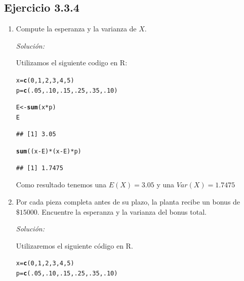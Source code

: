 \documentclass{article}\usepackage[]{graphicx}\usepackage[]{color}
\makeatletter
\newcommand{\hlnum}[1]{\textcolor[rgb]{0.686,0.059,0.569}{#1}}%
\newcommand{\hlopt}[1]{\textcolor[rgb]{0,0,0}{#1}}%
\newcommand{\hlstd}[1]{\textcolor[rgb]{0.345,0.345,0.345}{#1}}%
\newcommand{\hlkwb}[1]{\textcolor[rgb]{0.69,0.353,0.396}{#1}}%
\newcommand{\hlkwd}[1]{\textcolor[rgb]{0.737,0.353,0.396}{\textbf{#1}}}%
\newenvironment{kframe}{%
 \def\at@end@of@kframe{}%
 \ifinner\ifhmode%
  \def\at@end@of@kframe{\end{minipage}}%
  \begin{minipage}{\columnwidth}%
 \fi\fi%
 \def\FrameCommand##1{\hskip\@totalleftmargin \hskip-\fboxsep
 \colorbox{shadecolor}{##1}\hskip-\fboxsep
     \hskip-\linewidth \hskip-\@totalleftmargin \hskip\columnwidth}%
 \MakeFramed {\advance\hsize-\width
   \@totalleftmargin\z@ \linewidth\hsize
   \@setminipage}}%
 {\par\unskip\endMakeFramed%
 \at@end@of@kframe}
\newenvironment{knitrout}{}{} %
\makeatother
\begin{document}
\subsection{Ejercicio 3.3.4}
\begin{enumerate}
    \item Compute la esperanza y la varianza de $X$.
    
    \textit{Solución: }
    
Utilizamos el siguiente codigo en R:

\begin{knitrout}
\color{fgcolor}\begin{kframe}
\begin{alltt}
\hlstd{x}\hlkwb{=} \hlkwd{c}\hlstd{(}\hlnum{0}\hlstd{,}\hlnum{1}\hlstd{,}\hlnum{2}\hlstd{,}\hlnum{3}\hlstd{,}\hlnum{4}\hlstd{,}\hlnum{5}\hlstd{)}
\hlstd{p}\hlkwb{=} \hlkwd{c}\hlstd{(}\hlnum{.05}\hlstd{,}\hlnum{.10}\hlstd{,}\hlnum{.15}\hlstd{,}\hlnum{.25}\hlstd{,}\hlnum{.35}\hlstd{,}\hlnum{.10}\hlstd{)}

\hlstd{E}\hlkwb{<-}\hlkwd{sum}\hlstd{(x}\hlopt{*}\hlstd{p)}
\hlstd{E}
\end{alltt}
\begin{verbatim}
## [1] 3.05
\end{verbatim}
\begin{alltt}
\hlkwd{sum}\hlstd{((x}\hlopt{-}\hlstd{E)}\hlopt{*}\hlstd{(x}\hlopt{-}\hlstd{E)}\hlopt{*}\hlstd{p)}
\end{alltt}
\begin{verbatim}
## [1] 1.7475
\end{verbatim}
\end{kframe}
\end{knitrout}
Como resultado tenemos una $E(X)= 3.05$ y una $Var(X)= 1.7475$

\item Por cada pieza completa antes de su plazo, la planta recibe un bonus de $\$15000 $. Encuentre la esperanza y la varianza del bonus total.

\textit{Solución:}

Utilizaremos el siguiente código en R.
\begin{knitrout}
\color{fgcolor}\begin{kframe}
\begin{alltt}
\hlstd{x}\hlkwb{=} \hlkwd{c}\hlstd{(}\hlnum{0}\hlstd{,}\hlnum{1}\hlstd{,}\hlnum{2}\hlstd{,}\hlnum{3}\hlstd{,}\hlnum{4}\hlstd{,}\hlnum{5}\hlstd{)}
\hlstd{p}\hlkwb{=} \hlkwd{c}\hlstd{(}\hlnum{.05}\hlstd{,}\hlnum{.10}\hlstd{,}\hlnum{.15}\hlstd{,}\hlnum{.25}\hlstd{,}\hlnum{.35}\hlstd{,}\hlnum{.10}\hlstd{)}


\end{alltt}
\end{kframe}
\end{knitrout}
\end{enumerate}
\end{document}
